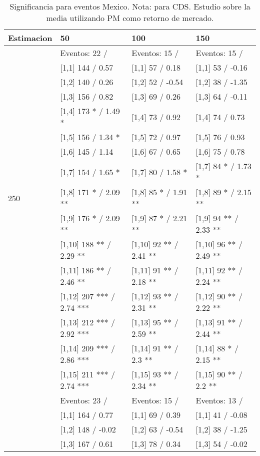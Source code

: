\begin{table}

\caption{Significancia para eventos Mexico. Nota: para CDS. Estudio sobre la media utilizando PM como retorno de mercado.}
\centering
\begin{tabular}[t]{llll}
\toprule
Estimacion & 50 & 100 & 150\\
\midrule
 & Eventos:  22 / & Eventos:  15 / & Eventos:  15 /\\
 & {}[1,1] 144  / 0.57 & {}[1,1] 57  / 0.18 & {}[1,1] 53  / -0.16\\
 & {}[1,2] 140  / 0.26 & {}[1,2] 52  / -0.54 & {}[1,2] 38  / -1.35\\
 & {}[1,3] 156  / 0.82 & {}[1,3] 69  / 0.26 & {}[1,3] 64  / -0.11\\
 & {}[1,4] 173 * / 1.49 * & {}[1,4] 73  / 0.92 & {}[1,4] 74  / 0.73\\
\addlinespace
 & {}[1,5] 156  / 1.34 * & {}[1,5] 72  / 0.97 & {}[1,5] 76  / 0.93\\
 & {}[1,6] 145  / 1.14 & {}[1,6] 67  / 0.65 & {}[1,6] 75  / 0.78\\
 & {}[1,7] 154  / 1.65 * & {}[1,7] 80  / 1.58 * & {}[1,7] 84 * / 1.73 *\\
250 & {}[1,8] 171 * / 2.09 ** & {}[1,8] 85 * / 1.91 ** & {}[1,8] 89 * / 2.15 **\\
 & {}[1,9] 176 * / 2.09 ** & {}[1,9] 87 * / 2.21 ** & {}[1,9] 94 ** / 2.33 **\\
\addlinespace
 & {}[1,10] 188 ** / 2.29 ** & {}[1,10] 92 ** / 2.41 ** & {}[1,10] 96 ** / 2.49 **\\
 & {}[1,11] 186 ** / 2.46 ** & {}[1,11] 91 ** / 2.18 ** & {}[1,11] 92 ** / 2.24 **\\
 & {}[1,12] 207 *** / 2.74 *** & {}[1,12] 93 ** / 2.31 ** & {}[1,12] 90 ** / 2.22 **\\
 & {}[1,13] 212 *** / 2.92 *** & {}[1,13] 95 ** / 2.59 ** & {}[1,13] 91 ** / 2.44 **\\
 & {}[1,14] 209 *** / 2.86 *** & {}[1,14] 91 ** / 2.3 ** & {}[1,14] 88 * / 2.15 **\\
\addlinespace
 & {}[1,15] 211 *** / 2.74 *** & {}[1,15] 93 ** / 2.34 ** & {}[1,15] 90 ** / 2.2 **\\
 & Eventos:  23 / & Eventos:  15 / & Eventos:  13 /\\
 & {}[1,1] 164  / 0.77 & {}[1,1] 69  / 0.39 & {}[1,1] 41  / -0.08\\
 & {}[1,2] 148  / -0.02 & {}[1,2] 63  / -0.54 & {}[1,2] 38  / -1.25\\
 & {}[1,3] 167  / 0.61 & {}[1,3] 78  / 0.34 & {}[1,3] 54  / -0.02\\

\end{tabular}
\end{table}
